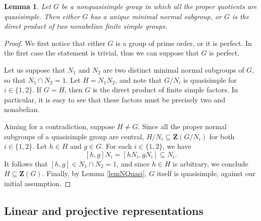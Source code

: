 \documentclass{daj}
\newtheorem{lemma}[theorem]{Lemma}
\theoremstyle{definition}
\theoremstyle{remark}
\newcommand{\Z}{\mathbf{Z}}
\begin{document}
\begin{lemma} \label{lemKey}
	Let $G$ be a nonquasisimple group in which all the proper quotients are quasisimple.
	Then either $G$ has a unique minimal normal subgroup, or $G$ is the direct product of two nonabelian finite simple groups.
\end{lemma}
\begin{proof}
	We first notice that either $G$ is a group of prime order, or it is perfect.
	In the first case the statement is trivial, thus we can suppose that $G$ is perfect.
	
	Let us suppose that $N_1$ and $N_2$ are two distinct minimal normal subgroups of $G$, so that $N_1 \cap N_2 =1$.
	Let $H=N_1N_2$, and note that $G/N_i$ is quasisimple for $i\in \{1,2\}$.
	If $G=H$, then $G$ is the direct product of finite simple factors.
	In particular, it is easy to see that these factors must be precisely two and nonabelian.
	
	Aiming for a contradiction, suppose $H \neq G$.
	Since all the proper normal subgroups of a quasisimple group are central,
	$H/N_i \subseteq \Z(G/N_i)$ for both $i\in \{1,2\}$.
	Let $h \in H$ and $g \in G$. For each $i\in \{1,2\}$, we have
	$$ [h,g]N_i = [hN_i,gN_i] \subseteq N_i . $$
	It follows that $[h,g] \in N_1 \cap N_2 =1$, and since $h \in H$ is arbitrary, we conclude $H \subseteq\Z(G)$.
	Finally, by Lemma \ref{lemNQuasi}, $G$ itself is quasisimple, against our initial assumption.
\end{proof}



























\subsection{Linear and projective representations} 
\end{document}
